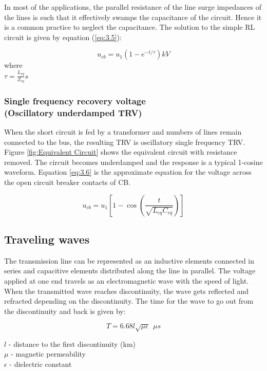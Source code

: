 In most of the applications, the parallel resistance of the line surge impedances of the lines is such that it effectively swamps the capacitance of the circuit. Hence it is a common practice to neglect the capacitance. The solution to the simple RL circuit is given by equation (\ref{eq:3.5}):

\begin{equation}\label{eq:3.5}
u_{cb} = u_1 \left( 1 - e^{-t / \tau} \right) kV
\end{equation}
where\\
$\tau = \frac{L_{eq}}{Z_{eq}} s$

\subsubsection[Single frequency recovery voltage]{Single frequency recovery voltage\\(Oscillatory underdamped TRV)}
When the short circuit is fed by a transformer and numbers of lines remain connected to the bus, the resulting TRV is oscillatory single frequency TRV. Figure \ref{fig:Equivalent Circuit} shows the equivalent circuit with resistance removed. The circuit becomes underdamped and the response is a typical 1-cosine waveform. Equation \ref{eq:3.6} is the approximate equation for the voltage across the open circuit breaker contacts of CB.

\begin{equation}\label{eq:3.6}
u_{cb} = u_1 \left[ 1 - \cos \left( \frac{t}{\sqrt{L_{eq} C_{eq}}} \right) \right]
\end{equation}

\subsection{Traveling waves}
The transmission line can be represented as an inductive elements connected in series and capacitive elements distributed along the line in parallel. The voltage applied at one end travels as an electromagnetic wave with the speed of light. When the transmitted wave reaches discontinuity, the wave gets reflected and refracted depending on the discontinuity. The time for the wave to go out from the discontinuity and back is given by:

\begin{equation}\label{eq:3.7}
T = 6.68 l \sqrt{\mu \epsilon} ~~\mu s
\end{equation}

$l$ - distance to the first discontinuity (km)\\
$\mu$ - magnetic permeability\\
$\epsilon$ - dielectric constant

